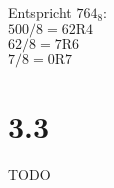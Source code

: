 \begin{enumerate}
Entspricht $764_8$:\\
$500 / 8 = 62 \textrm{R} 4$\\
$62 / 8 = 7 \textrm{R} 6$\\
$7 / 8 = 0 \textrm{R} 7$
\end{enumerate}

\section*{3.3}
TODO
